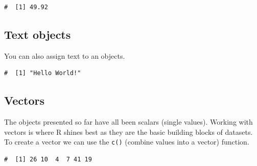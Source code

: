 \documentclass[a4paper,9pt,twocolumn,twoside,printwatermark=false]{pinp}
\begin{document}
\begin{ShadedResult}
\begin{verbatim}
#  [1] 49.92
\end{verbatim}
\end{ShadedResult}

\subsection{Text objects}\label{text-objects}

You can also assign text to an objects.

\begin{Shaded}
\begin{Highlighting}[]
\end{Highlighting}
\end{Shaded}

\begin{ShadedResult}
\begin{verbatim}
#  [1] "Hello World!"
\end{verbatim}
\end{ShadedResult}

\subsection{Vectors}\label{vectors}

The objects presented so far have all been scalars (single values).
Working with vectors is where R shines best as they are the basic
building blocks of datasets. To create a vector we can use the
\texttt{c()} (combine values into a vector) function.

\begin{Shaded}
\begin{Highlighting}[]
\StringTok{ }\NormalTok{(}\NormalTok{, }\NormalTok{, }\NormalTok{, }\NormalTok{, }\NormalTok{, }\NormalTok{)}
\end{Highlighting}
\end{Shaded}

\begin{ShadedResult}
\begin{verbatim}
#  [1] 26 10  4  7 41 19
\end{verbatim}
\end{ShadedResult}
\end{document}
